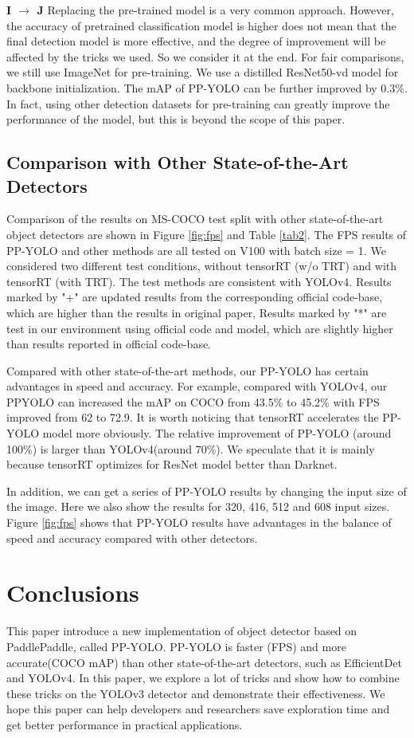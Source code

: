 \documentclass[10pt,twocolumn,letterpaper]{article}
\newcommand{\pheadB}[1] {\vspace{1mm}\noindent\textbf{#1}}
\begin{document}
	\pheadB{I $\rightarrow$ J} 
	Replacing the pre-trained model is a very common approach. However, the accuracy of pretrained classification model is higher does not mean that the final detection model is more effective, and the degree of improvement will be affected by the tricks we used. So we consider it at the end.
	For fair comparisons, we still use ImageNet for pre-training. We use a distilled ResNet50-vd model for backbone initialization. The mAP of PP-YOLO can be further improved by 0.3\%. In fact, using other detection datasets for pre-training can greatly improve the performance of the model, but this is beyond the scope of this paper.
	
	\subsection{Comparison with Other State-of-the-Art Detectors}	
	
	Comparison of the results on MS-COCO test split with other state-of-the-art object detectors are shown in Figure \ref{fig:fps} and Table \ref{tab2}. The FPS results of PP-YOLO and other methods are all tested on V100 with batch size = 1. 
	We considered two different test conditions, without tensorRT (w/o TRT) and with tensorRT (with TRT). The test methods are consistent with YOLOv4\cite{yolov4}. 
	Results marked by "+" are updated results from the corresponding official code-base, which are higher than the results in original paper, 
	Results marked by "*" are test in our environment using official code and model, which are slightly higher than results reported in official code-base.
	
	Compared with other state-of-the-art methods, our PP-YOLO has certain advantages in speed and accuracy. For example, compared with YOLOv4, our PPYOLO can increased the mAP on COCO from 43.5\% to 45.2\% with FPS improved from 62 to 72.9. It is worth noticing that tensorRT accelerates the PP-YOLO model more obviously. The relative improvement of PP-YOLO (around 100\%) is larger than YOLOv4(around 70\%). We speculate that it is mainly because tensorRT optimizes for ResNet model better than Darknet.
	
	In addition, we can get a series of PP-YOLO results by changing the input size of the image. Here we also show the results for 320, 416, 512 and 608 input sizes. Figure \ref{fig:fps} shows that PP-YOLO results have advantages in the balance of speed and accuracy compared with other detectors.
	
	\section{Conclusions}
	
	This paper introduce a new implementation of object detector based on PaddlePaddle, called PP-YOLO.  PP-YOLO is faster (FPS) and more accurate(COCO mAP) than other state-of-the-art detectors, such as EfficientDet and YOLOv4. In this paper, we explore a lot of tricks and show how to combine these tricks on the YOLOv3 detector and demonstrate their effectiveness. We hope this paper can help developers and researchers save exploration time and get better performance in practical applications.
	
	
	
\end{document}
